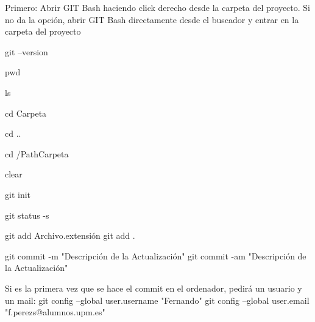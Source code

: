 
Primero: Abrir GIT Bash haciendo click derecho desde la carpeta del proyecto. Si no da la opción, abrir GIT Bash directamente desde el buscador y entrar en la carpeta del proyecto

	git --version		%

	pwd					%

	ls					%

	cd Carpeta			%

	cd ..				%

	cd /PathCarpeta		%

	clear				%



	git init		%

	git status -s	%

	git add Archivo.extensión	%
	git add .					%

	git commit -m "Descripción de la Actualización"		%
	git commit -am "Descripción de la Actualización"	%
	
	Si es la primera vez que se hace el commit en el ordenador, pedirá un usuario y un mail:
	git config --global user.username "Fernando"
	git config --global user.email "f.perezs@alumnos.upm.es"


